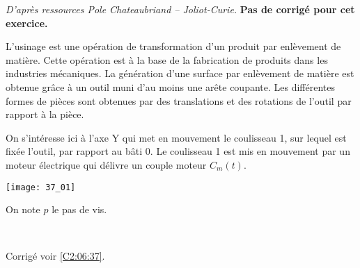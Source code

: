 \normaltrue \difficilefalse \tdifficilefalse
\correctionfalse


\textit{D'après ressources Pole Chateaubriand -- Joliot-Curie.}
\setcounter{numques}{0}
\ifcorrection
\else
\textbf{Pas de corrigé pour cet exercice.}
\fi

\ifprof
\else
L’usinage est une opération de transformation d’un produit par enlèvement de matière.
Cette opération est à la base de la fabrication de produits dans les industries mécaniques.
La génération d’une surface par enlèvement de matière est obtenue grâce à un outil muni
d’au moins une arête coupante. Les différentes formes de pièces sont obtenues par des
translations et des rotations de l'outil par rapport à la pièce.


On s’intéresse ici à l’axe Y qui met en mouvement le coulisseau 1,
sur lequel est fixée l’outil, par rapport au bâti 0. Le coulisseau 1 est mis en mouvement par un moteur
électrique qui délivre un couple moteur $C_m(t)$.

\begin{center}
\texttt{[image: 37\_01]}
\end{center}

On note $p$ le pas de vis. 
\fi


\ifprof
\else
\fi

\ifprof ~\\
\else
\fi

\ifprof
\else
\begin{flushright}
\footnotesize{Corrigé  voir \ref{C2:06:37}.}
\end{flushright}%
\fi